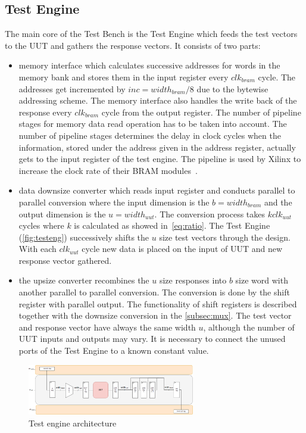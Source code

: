 \subsection{Test Engine}\label{ssec:engine}
The main core of the Test Bench is the Test Engine which feeds the test vectors to the UUT and gathers the response vectors. It consists of two parts:
\begin{itemize}
    \item memory interface which calculates successive addresses for words in the memory bank and stores them in the input register every $clk_{bram}$ cycle. The addresses get incremented by $inc = width_{bram}/8$ due to the bytewise addressing scheme. The memory interface also handles the write back of the response every $clk_{bram}$ cycle from the output register. The number of pipeline stages for memory data read operation has to be taken into account. The number of pipeline stages determines the delay in clock cycles when the information, stored under the address given in the address register, actually gets to the input register of the test engine. The pipeline is used by Xilinx to increase the clock rate of their BRAM modules~\cite{report:BRAM}.
    \item data downsize converter which reads input register and conducts parallel to parallel conversion where the input dimension is the $b=width_{bram}$ and the output dimension is the $u=width_{uut}$. The conversion process takes $k clk_{uut}$ cycles where $k$ is calculated as showed in~\autoref*{eq:ratio}. The Test Engine (\autoref{fig:testeng}) successively shifts the $u$ size test vectors through the design. With each $clk_{uut}$ cycle new data is placed on the input of UUT and new response vector gathered.
    \item the upsize converter recombines the $u$ size responses into $b$ size word with another parallel to parallel conversion. The conversion is done by the shift register with parallel output. The functionality of shift registers is described together with the downsize conversion in the \autoref{subsec:mux}. The test vector and response vector have always the same width $u$, although the number of UUT inputs and outputs may vary. It is necessary to connect the unused ports of the Test Engine to a known constant value.
\end{itemize}
\begin{figure}[h]
\centering
\includegraphics[width=0.65\textwidth]{figures/Test_Engine_complex.png}
\caption{Test engine architecture}
\label{fig:testeng}
\end{figure}


